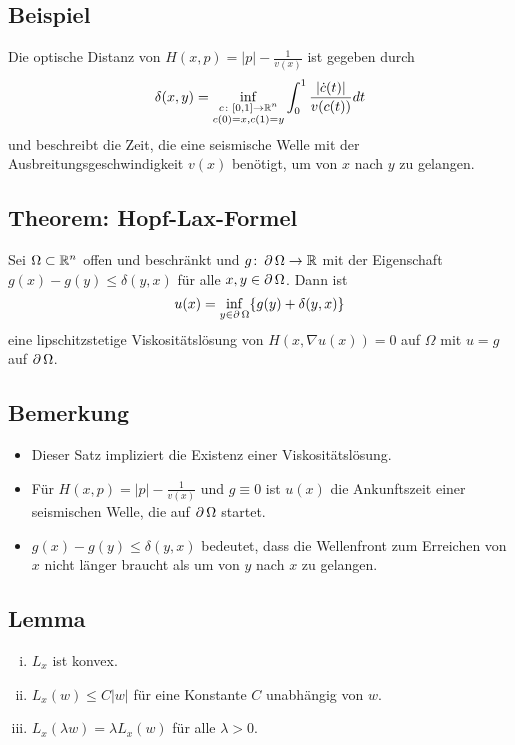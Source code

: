 \subsection{Beispiel}
\label{bsp_28}
	Die optische Distanz von $H(x,p) = |p| - \frac{1}{v(x)}$ ist gegeben durch
	\[ \delta(x,y) = \inf_{\substack{c\colon[0,1] \rightarrow \mathbb{R}^n \\ c(0) = x, c(1) = y}} \int_{0}^{1} \frac{|\dot{c}(t)|}{v(c(t))} dt \]
	und beschreibt die Zeit, die eine seismische Welle mit der Ausbreitungsgeschwindigkeit $v(x)$ benötigt, um von $x$ nach $y$ zu gelangen. \marginnote{[28]}

\subsection{Theorem: Hopf-Lax-Formel}
\label{thm_29}
	Sei $\Omega \subset \mathbb{R}^n$ offen und beschränkt  und $g\colon \operatorname{\partial} \Omega \rightarrow \mathbb{R}$ mit der Eigenschaft $g(x)-g(y) \leq \delta(y,x)$ für alle $x,y \in \operatorname{\partial} \Omega$. Dann ist
	\[ u(x) = \inf_{y \in \operatorname{\partial} \Omega} \{g(y) + \delta(y,x) \} \]
	eine lipschitzstetige Viskositätslösung von $H(x,\nabla u(x)) = 0$ auf $\Omega$ mit $u = g$ auf $\operatorname{\partial} \Omega$.
	
\subsection{Bemerkung}
\label{bem_30}
	\begin{itemize}
		\item Dieser Satz impliziert die Existenz einer Viskositätslösung. \marginnote{[30]}
		\item Für $H(x,p) = |p| - \frac{1}{v(x)}$ und $g \equiv 0$ ist $u(x)$ die Ankunftszeit einer seismischen Welle, die auf $\operatorname{\partial} \Omega$ startet.
		\item $g(x) - g(y) \leq \delta(y,x)$ bedeutet, dass die Wellenfront zum Erreichen von $x$ nicht länger braucht als um von $y$ nach $x$ zu gelangen.
	\end{itemize}
	
\subsection{Lemma}
\label{bem_31}
	\begin{enumerate}[(i)]
		\item $L_x$ ist konvex. \marginnote{[31]}
		\item $L_x(w) \leq C|w|$ für eine Konstante $C$ unabhängig von $w$.
		\item $L_x(\lambda w) = \lambda L_x(w)$ für alle $\lambda > 0$.
	\end{enumerate}
	
